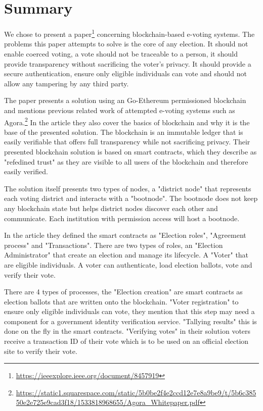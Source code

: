 \section{Summary}\label{sec:summary}
We chose to present a paper\footnote{\href{https://ieeexplore.ieee.org/
document/8457919}{https://ieeexplore.ieee.org/document/8457919}}
concerning blockchain-based e-voting systems. The problems this paper
attempts to solve is the core of any election. It should not enable 
coerced voting, a vote should not be traceable to a person, it should
provide transparency without sacrificing the voter's privacy. It should
provide a secure authentication, ensure only eligible individuals can vote
and should not allow any tampering by any third party.

The paper presents a solution using an Go-Ethereum permissioned blockchain and
mentions previous related work of attempted e-voting systems such as Agora.\footnote{
\href{https://static1.squarespace.com/static/5b0be2f4e2ccd12e7e8a9be9/t/5b6c38550e2e725e9cad3f18/1533818968655/Agora_Whitepaper.pdf}{https://static1.squarespace.com/static/5b0be2f4e2ccd12e7e8a9be9/t/5b6c38550e2e725e9cad3f18/1533818968655/Agora\_Whitepaper.pdf}} In the article they also cover the basics of
blockchain and why it is the base of the presented solution. The blockchain
is an immutable ledger that is easily verifiable that offers full transparency
while not sacrificing privacy. Their presented blockchain solution is based
on smart contracts, which they describe as "refedined trust" as they are
visible to all users of the blockchain and therefore easily verified.

The solution itself presents two types of nodes, a "district node" that
represents each voting district and interacts with a "bootnode". The
bootnode does not keep any blockchain state but helps district nodes discover
each other and communicate. Each institution with permission access will host
a bootnode.

In the article they defined the smart contracts as "Election roles",
"Agreement process" and "Transactions". There are two types of roles,
an "Election Administrator" that create an election and manage its lifecycle.
A "Voter" that are eligible individuals. A voter can authenticate, load election
ballots, vote and verify their vote.

There are 4 types of processes, the "Election creation" are smart contracts as
election ballots that are written onto the blockchain. "Voter registration" to
ensure only eligible individuals can vote, they mention that this step may need
a component for a government identity verification service. "Tallying results"
this is done on the fly in the smart contracts. "Verifying votes" in their solution
voters receive a transaction ID of their vote which is to be used on an official
election site to verify their vote.

